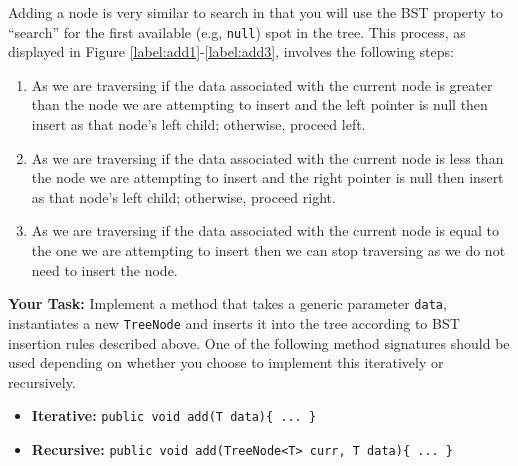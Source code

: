 Adding a node is very similar to search in that you will use the BST property
to ``search'' for the first available (e.g, \lstinline|null|) spot in the tree.
This process, as displayed in Figure \ref{label:add1}-\ref{label:add3},
involves the following steps: 
\begin{enumerate}
    \item As we are traversing if the data associated with the current node is greater than the node we are attempting to insert and the left pointer is null then insert as that node's left child; otherwise, proceed left.
    \item As we are traversing if the data associated with the current node is less than the node we are attempting to insert and the right pointer is null then insert as that node's left child; otherwise, proceed right.
    \item As we are traversing if the data associated with the current node is equal to the one we are attempting to insert then we can stop traversing as we do not need to insert the node.
\end{enumerate}

\textbf{Your Task:} Implement a method  that takes a generic parameter
\lstinline|data|, instantiates a new \lstinline|TreeNode|  and inserts it into
the tree according to BST insertion rules described above. One of the following
method signatures should be used depending on whether you choose to implement
this iteratively or recursively.
\begin{itemize}
    \item \textbf{Iterative:} \lstinline|public void add(T data){ ... }|
    \item \textbf{Recursive:} \lstinline|public void add(TreeNode<T> curr, T data){ ... }|
\end{itemize}

